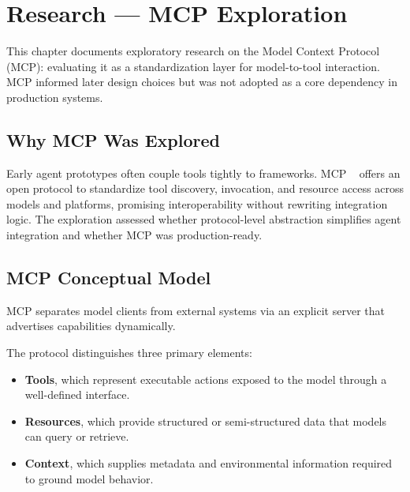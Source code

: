 \chapter{Research --- MCP Exploration}
\label{ch:MCPExploration}

This chapter documents exploratory research on the Model Context Protocol
(MCP): evaluating it as a standardization layer for model-to-tool interaction.
MCP informed later design choices but was not adopted as a core dependency in
production systems.

\section{Why MCP Was Explored}
\label{sec:MCP_Why}

Early agent prototypes often couple tools tightly to frameworks. MCP
~\cite{anthropicMCP} offers an open protocol to standardize tool discovery,
invocation, and resource access across models and platforms, promising
interoperability without rewriting integration logic. The exploration assessed
whether protocol-level abstraction simplifies agent integration and whether MCP
was production-ready.

\section{MCP Conceptual Model}
\label{sec:MCP_Conceptual}

MCP separates model clients from external systems via an explicit server that
advertises capabilities dynamically.

The protocol distinguishes three primary elements:

\begin{itemize}
    \item \textbf{Tools}, which represent executable actions exposed to the
          model through a well-defined interface.
    \item \textbf{Resources}, which provide structured or semi-structured data
          that models can query or retrieve.
    \item \textbf{Context}, which supplies metadata and environmental
          information required to ground model behavior.
\end{itemize}

